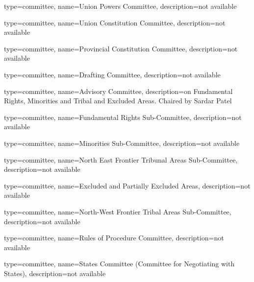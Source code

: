 
{	type=committee,
  name={Union Powers Committee},
  description={not available}
}

{	type=committee,
  name={Union Constitution Committee},
  description={not available}
}

{	type=committee,
  name={Provincial Constitution Committee},
  description={not available}
}

{	type=committee,
  name={Drafting Committee},
  description={not available}
}

{	type=committee,
  name={Advisory Committee},
  description={on Fundamental Rights, Minorities and Tribal and Excluded Areas. Chaired by Sardar Patel}
}

{	type=committee,
  name={Fundamental Rights Sub-Committee},
  description={not available}
}

{	type=committee,
  name={Minorities Sub-Committee},
  description={not available}
}

{	type=committee,
  name={North East Frontier Tribunal Areas Sub-Committee},
  description={not available}
}

{	type=committee,
  name={Excluded and Partially Excluded Areas},
  description={not available}
}

{	type=committee,
  name={North-West Frontier Tribal Areas Sub-Committee},
  description={not available}
}

{	type=committee,
  name={Rules of Procedure Committee},
  description={not available}
}

{	type=committee,
  name={States Committee (Committee for Negotiating with States)},
  description={not available}
}

